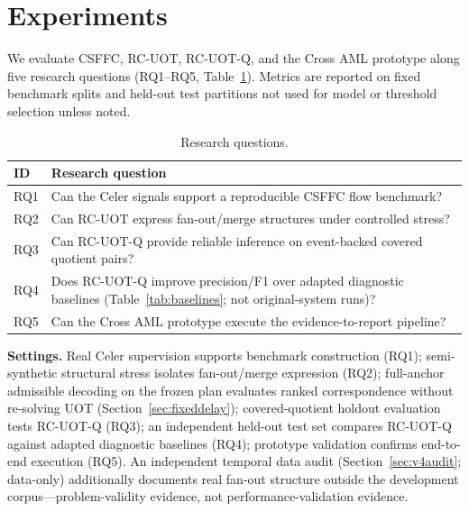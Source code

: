 
\section{Experiments}
\label{sec:experiments}

We evaluate CSFFC, RC-UOT, RC-UOT-Q, and the Cross AML prototype along five research questions (RQ1--RQ5, Table~\ref{tab:rq}). Metrics are reported on fixed benchmark splits and held-out test partitions not used for model or threshold selection unless noted.

\begin{table}[!t]
\caption{Research questions.}
\label{tab:rq}
\centering
\footnotesize
\begin{tabular}{p{}p{}}
\toprule
ID & Research question \\
\midrule
RQ1 & Can the Celer signals support a reproducible CSFFC flow benchmark? \\
RQ2 & Can RC-UOT express fan-out/merge structures under controlled stress? \\
RQ3 & Can RC-UOT-Q provide reliable inference on event-backed covered quotient pairs? \\
RQ4 & Does RC-UOT-Q improve precision/F1 over adapted diagnostic baselines (Table~\ref{tab:baselines}; not original-system runs)? \\
RQ5 & Can the Cross AML prototype execute the evidence-to-report pipeline? \\
\bottomrule
\end{tabular}
\end{table}

\textbf{Settings.} Real Celer supervision supports benchmark construction (RQ1); semi-synthetic structural stress isolates fan-out/merge expression (RQ2); full-anchor admissible decoding on the frozen plan evaluates ranked correspondence without re-solving UOT (Section~\ref{sec:fixeddelay}); covered-quotient holdout evaluation tests RC-UOT-Q (RQ3); an independent held-out test set compares RC-UOT-Q against adapted diagnostic baselines (RQ4); prototype validation confirms end-to-end execution (RQ5). An independent temporal data audit (Section~\ref{sec:v4audit}; data-only) additionally documents real fan-out structure outside the development corpus---problem-validity evidence, not performance-validation evidence.


